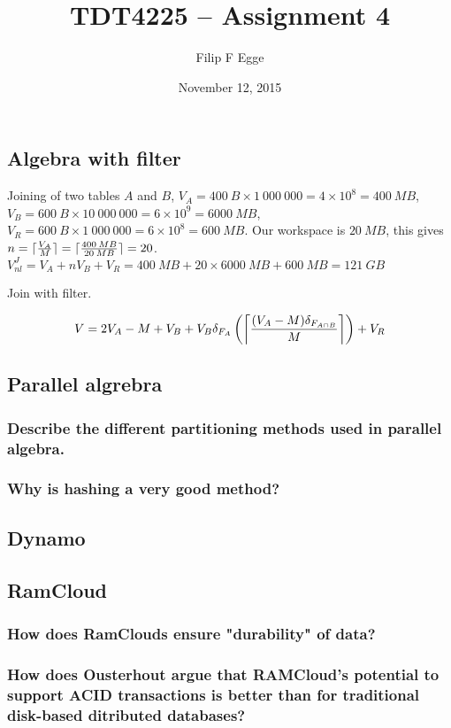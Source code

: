 \documentclass{article}
\DeclarePairedDelimiter{\ceil}{\lceil}{\rceil}
\begin{document}
 
\title{TDT4225 -- Assignment 4} 
\author{Filip F Egge}
\date{November 12, 2015} 
\maketitle

\newpage
\subsection*{Algebra with filter}
Joining of two tables $A$ and $B$, $V_A = 400\:B \times 1\:000\:000 = 4 \times 10^8 = 400\:MB$, $V_B = 600\:B \times 10\:000\:000 = 6 \times 10^9 = 6000\:MB$,
$V_R = 600\:B \times 1\:000\:000 = 6 \times 10^8 = 600\:MB$. Our workspace is $20\:MB$, this gives $n = \ceil{\frac{V_A}{M}} = \ceil{\frac{400\:MB}{20\:MB}} = 20$.
$V_{nl}^J = V_A + nV_B + V_R = 400\:MB + 20 \times 6000\:MB + 600\:MB = 121\:GB$

Join with filter.

\[
    V = 2V_A - M + V_B + V_B \delta_{F_A} \left( \ceil*{\frac{(V_A - M) \delta_{F_{A\cap B}}}{M}}\right) + V_R
\]

\subsection*{Parallel algrebra}
\subsubsection*{Describe the different partitioning methods used in parallel algebra.}
\subsubsection*{Why is hashing a very good method?}

\subsection*{Dynamo}

\subsection*{RamCloud}
\subsubsection*{How does RamClouds ensure "durability" of data?}
\subsubsection*{How does Ousterhout argue that RAMCloud's potential to support ACID transactions is better than for traditional disk-based ditributed databases?}
\end{document}
